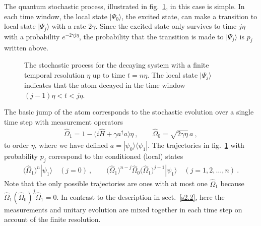 \documentclass[12pt]{article}
\theoremstyle{plain}
\theoremstyle{definition}
\theoremstyle{remark}
\def\bra#1{\langle #1|}
\def\ket#1{| #1\rangle}
\newcommand{\EQ}[1]{\begin{equation}\begin{split} #1
\end{split}\end{equation}}
\begin{document}
The quantum stochastic process, illustrated in fig.~\ref{f7}, in this case is simple. In each time window, the local state $\ket{\Psi_0}$, the excited state, can make a transition to local state $\ket{\Psi_j}$ with a rate $2\gamma$. Since the excited state 
only survives to time $j\eta$ with a probability $e^{-2\gamma j\eta}$, the probability that the transition is made to $\ket{\Psi_j}$ is $p_j$ written above.
\begin{figure}[ht]
\begin{center}
\end{center}
\caption{The stochastic process for the decaying system with a finite temporal resolution $\eta$ up to time $t=n\eta$. The local state $\ket{\Psi_j}$ indicates that the atom decayed in the time window $(j-1)\eta<t<j\eta$.}
\label{f7}
\end{figure}

The basic jump of the atom corresponds to the stochastic evolution over a single time step with measurement operators
\EQ{
\hat\Omega_1=1-\big(i\hat H+\gamma a^\dagger a\big)\eta\ ,\qquad\hat\Omega_0=\sqrt{2\gamma\eta}\,a\ ,
}
to order $\eta$, where we have defined $a=\ket{\psi_0}\bra{\psi_1}$. The trajectories in fig.~\ref{f7} with probability $p_j$ correspond to the conditioned (local) states
\EQ{
\big(\hat\Omega_1\big)^n\ket{\psi_1}\quad (j=0)\ ,\qquad\big(\hat\Omega_1\big)^{n-j}\hat\Omega_0\big(\hat\Omega_1\big)^{j-1}\ket{\psi_1}\quad(j=1,2,\ldots,n)\ .
}
Note that the only possible trajectories are ones with at most one $\hat\Omega_1$ because
$\hat\Omega_1(\hat\Omega_0)^j\hat\Omega_1=0$. In contrast to the description in sect.~\ref{s2.2}, here the measurements and unitary evolution are mixed together in each time step on account of the finite resolution. 
\end{document}
